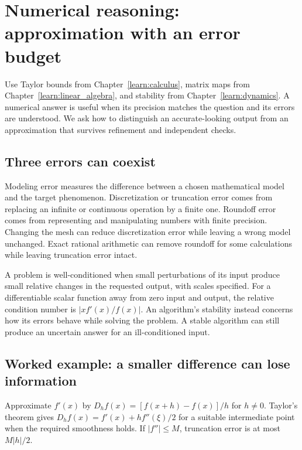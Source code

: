 \chapter{Numerical reasoning: approximation with an error budget}
\label{learn:numerical}



Use Taylor bounds from Chapter~\ref{learn:calculus}, matrix maps from
Chapter~\ref{learn:linear_algebra}, and stability from
Chapter~\ref{learn:dynamics}. A numerical answer is useful when its precision
matches the question and its errors are understood. We ask how to distinguish
an accurate-looking output from an approximation that survives refinement
and independent checks.



\section{Three errors can coexist}
Modeling error measures the difference between a chosen mathematical model
and the target phenomenon. Discretization or truncation error comes from
replacing an infinite or continuous operation by a finite one. Roundoff error
comes from representing and manipulating numbers with finite precision.
Changing the mesh can reduce discretization error while leaving a wrong model
unchanged. Exact rational arithmetic can remove roundoff for some calculations
while leaving truncation error intact.

A problem is well-conditioned when small perturbations of its input produce
small relative changes in the requested output, with scales specified.
For a differentiable scalar function away from zero input and output, the
relative condition number is $|xf'(x)/f(x)|$. An algorithm's stability
instead concerns how its errors behave while solving the problem. A stable
algorithm can still produce an uncertain answer for an ill-conditioned input.

\section{Worked example: a smaller difference can lose information}
Approximate $f'(x)$ by
$D_hf(x)=[f(x+h)-f(x)]/h$ for $h\ne0$. Taylor's theorem gives
$D_hf(x)=f'(x)+hf''(\xi)/2$ for a suitable intermediate point when the
required smoothness holds. If $|f''|\leq M$, truncation error is at most
$M|h|/2$.

